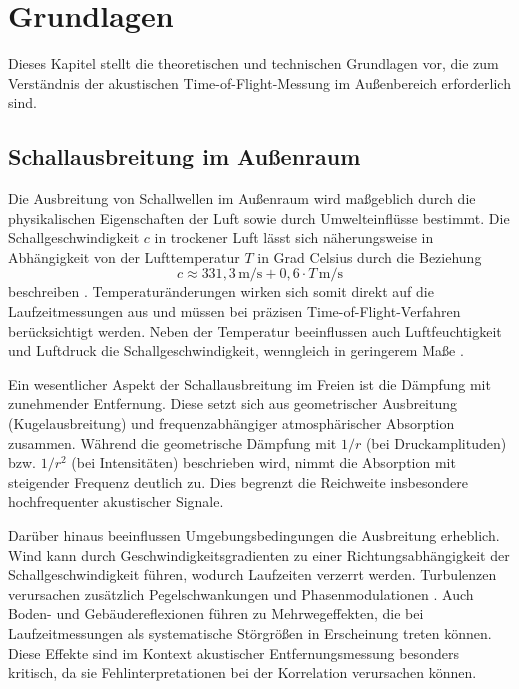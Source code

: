 \section{Grundlagen}

Dieses Kapitel stellt die theoretischen und technischen Grundlagen vor, die zum Verständnis der akustischen Time-of-Flight-Messung im Außenbereich erforderlich sind.

\subsection{Schallausbreitung im Außenraum}

Die Ausbreitung von Schallwellen im Außenraum wird maßgeblich durch die physikalischen Eigenschaften der Luft sowie durch Umwelteinflüsse bestimmt. Die Schallgeschwindigkeit $c$ in trockener Luft lässt sich näherungsweise in Abhängigkeit von der Lufttemperatur $T$ in Grad Celsius durch die Beziehung
\[
c \approx 331{,}3 \, \text{m/s} + 0{,}6 \cdot T \, \text{m/s}
\]
beschreiben \cite{kuttruff2000raumakustik}. Temperaturänderungen wirken sich somit direkt auf die Laufzeitmessungen aus und müssen bei präzisen Time-of-Flight-Verfahren berücksichtigt werden. Neben der Temperatur beeinflussen auch Luftfeuchtigkeit und Luftdruck die Schallgeschwindigkeit, wenngleich in geringerem Maße \cite{bass1995atmospheric}.

Ein wesentlicher Aspekt der Schallausbreitung im Freien ist die Dämpfung mit zunehmender Entfernung. Diese setzt sich aus geometrischer Ausbreitung (Kugelausbreitung) und frequenzabhängiger atmosphärischer Absorption zusammen. Während die geometrische Dämpfung mit $1/r$ (bei Druckamplituden) bzw. $1/r^2$ (bei Intensitäten) beschrieben wird, nimmt die Absorption mit steigender Frequenz deutlich zu. Dies begrenzt die Reichweite insbesondere hochfrequenter akustischer Signale.

Darüber hinaus beeinflussen Umgebungsbedingungen die Ausbreitung erheblich. Wind kann durch Geschwindigkeitsgradienten zu einer Richtungsabhängigkeit der Schallgeschwindigkeit führen, wodurch Laufzeiten verzerrt werden. Turbulenzen verursachen zusätzlich Pegelschwankungen und Phasenmodulationen \cite{salomons2001computational}. Auch Boden- und Gebäudereflexionen führen zu Mehrwegeffekten, die bei Laufzeitmessungen als systematische Störgrößen in Erscheinung treten können. Diese Effekte sind im Kontext akustischer Entfernungsmessung besonders kritisch, da sie Fehlinterpretationen bei der Korrelation verursachen können.

